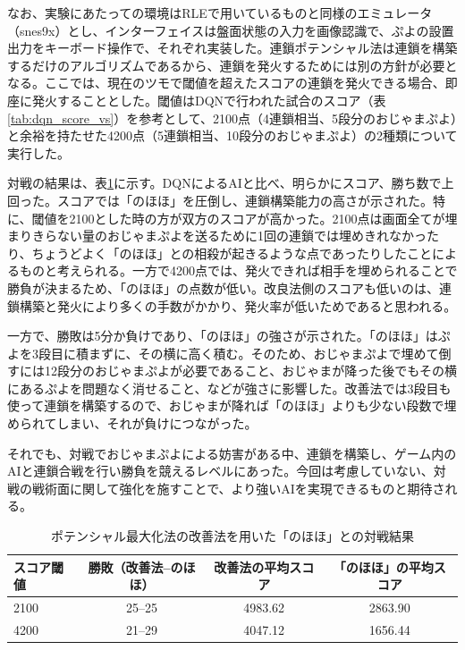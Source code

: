 \documentclass[12pt]{jarticle}
\begin{document}
なお、実験にあたっての環境はRLEで用いているものと同様のエミュレータ（snes9x）とし、インターフェイスは盤面状態の入力を画像認識で、ぷよの設置出力をキーボード操作で、それぞれ実装した。連鎖ポテンシャル法は連鎖を構築するだけのアルゴリズムであるから、連鎖を発火するためには別の方針が必要となる。ここでは、現在のツモで閾値を超えたスコアの連鎖を発火できる場合、即座に発火することとした。閾値はDQNで行われた試合のスコア（表\ref{tab:dqn_score_vs}）を参考として、2100点（4連鎖相当、5段分のおじゃまぷよ）と余裕を持たせた4200点（5連鎖相当、10段分のおじゃまぷよ）の2種類について実行した。

対戦の結果は、表\ref{tab:poten_vs}に示す。DQNによるAIと比べ、明らかにスコア、勝ち数で上回った。スコアでは「のほほ」を圧倒し、連鎖構築能力の高さが示された。特に、閾値を2100とした時の方が双方のスコアが高かった。2100点は画面全てが埋まりきらない量のおじゃまぷよを送るために1回の連鎖では埋めきれなかったり、ちょうどよく「のほほ」との相殺が起きるような点であったりしたことによるものと考えられる。一方で4200点では、発火できれば相手を埋められることで勝負が決まるため、「のほほ」の点数が低い。改良法側のスコアも低いのは、連鎖構築と発火により多くの手数がかかり、発火率が低いためであると思われる。

一方で、勝敗は5分か負けであり、「のほほ」の強さが示された。「のほほ」はぷよを3段目に積まずに、その横に高く積む。そのため、おじゃまぷよで埋めて倒すには12段分のおじゃまぷよが必要であること、おじゃまが降った後でもその横にあるぷよを問題なく消せること、などが強さに影響した。改善法では3段目も使って連鎖を構築するので、おじゃまが降れば「のほほ」よりも少ない段数で埋められてしまい、それが負けにつながった。

それでも、対戦でおじゃまぷよによる妨害がある中、連鎖を構築し、ゲーム内のAIと連鎖合戦を行い勝負を競えるレベルにあった。今回は考慮していない、対戦の戦術面に関して強化を施すことで、より強いAIを実現できるものと期待される。

\begin{table}[htb]
\begin{center}
\caption{ポテンシャル最大化法の改善法を用いた「のほほ」との対戦結果} \label{tab:poten_vs}
  \begin{tabular}{|l|c|c|c|} \hline
スコア閾値 & 勝敗（改善法--のほほ） & 改善法の平均スコア & 「のほほ」の平均スコア\\ \hline
2100 & 25--25 & 4983.62 & 2863.90\\ \hline
4200 & 21--29 & 4047.12 & 1656.44\\ \hline
\end{tabular}
\end{center}
\end{table}
\end{document}
